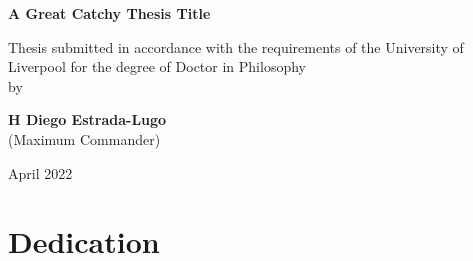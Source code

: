 \documentclass[12pt, oneside]{book}
\newcommand\blankpage{%
    \null
    \thispagestyle{empty}%
    \addtocounter{page}{-1}%
    \newpage}
\begin{document}
\begin{titlepage}
\begin{center}

\vspace*{2cm}

{\Large \textbf{A Great Catchy Thesis Title}} %

\vspace{5cm}
{Thesis submitted in accordance with the requirements of
the University of Liverpool for the degree of Doctor in Philosophy\\ by}

\vspace{2cm}
{\large \textbf{H Diego Estrada-Lugo}\\ (Maximum Commander)}
\vfill

April 2022


\end{center}
\end{titlepage}

\frontmatter 




\afterpage{\blankpage}

\chapter{Dedication}

\afterpage{\blankpage}
\end{document}
